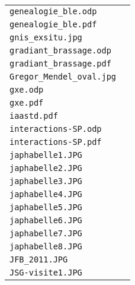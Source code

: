 \begin{center}
\begin{supertabular}{p{.8\textwidth}c}
\texttt{genealogie\_ble.odp} & \cite{genealogie_ble} \\
\texttt{genealogie\_ble.pdf} & \\ \hline

\texttt{gnis\_exsitu.jpg} & \cite{gnis_exsitu} \\ \hline

\texttt{gradiant\_brassage.odp} & \cite{gradiant_brassage} \\
\texttt{gradiant\_brassage.pdf} & \\ \hline

\texttt{Gregor\_Mendel\_oval.jpg} & \cite{Gregor_Mendel_oval} \\ \hline

\texttt{gxe.odp} & \cite{gxe} \\
\texttt{gxe.pdf} & \\ \hline

\texttt{iaastd.pdf} & \cite{iaastd} \\ \hline

\texttt{interactions-SP.odp} & \cite{interactions-SP} \\
\texttt{interactions-SP.pdf} \\ \hline

\texttt{japhabelle1.JPG} & \cite{japhabelle1} \\ \hline

\texttt{japhabelle2.JPG} & \cite{japhabelle2} \\ \hline

\texttt{japhabelle3.JPG} & \cite{japhabelle3} \\ \hline

\texttt{japhabelle4.JPG} & \cite{japhabelle4} \\ \hline

\texttt{japhabelle5.JPG} & \cite{japhabelle5} \\ \hline

\texttt{japhabelle6.JPG} & \cite{japhabelle6} \\ \hline

\texttt{japhabelle7.JPG} & \cite{japhabelle7} \\ \hline

\texttt{japhabelle8.JPG} & \cite{japhabelle8} \\ \hline

\texttt{JFB\_2011.JPG} & \cite{JFB_2011} \\ \hline

\texttt{JSG-visite1.JPG} & \cite{JSG-visite1} \\ \hline


\end{supertabular}
\end{center}
